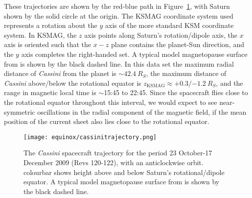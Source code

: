 These trajectories are shown by the red-blue path in Figure~\ref{equinox:fig:cassinitrajectory}, with Saturn shown by the solid circle at the origin. The KSMAG coordinate system used represents a rotation about the $y$ axis of the more standard KSM coordinate system. In KSMAG, the $z$ axis points along Saturn's rotation/dipole axis, the $x$ axis is oriented such that the $x-z$ plane contains the planet-Sun direction, and the $y$ axis completes the right-handed set. A typical model magnetopause surface from \citep{pilkington2015} is shown by the black dashed line. In this data set the maximum radial distance of \textit{Cassini} from the planet is ${\sim}\SI{42.4}{R_S}$, the maximum distance of \textit{Cassini} above/below the rotational equator is $z_\mathrm{KSMAG}\approx +0.3/\SI{-1.2}{R_S}$, and the range in magnetic local time is ${\sim}$15:45 to 22:45. Since the spacecraft flies close to the rotational equator throughout this interval, we would expect to see near-symmetric oscillations in the radial component of the magnetic field, if the mean position of the current sheet also lies close to the rotational equator.
\begin{figure}
\centering
\texttt{[image: equinox/cassinitrajectory.png]}
\caption[\textit{Cassini} spacecraft trajectory for 23 October – 17 December 2009.]{The \textit{Cassini} spacecraft trajectory for the period 23 October{\--}17 December 2009 (Revs 120{\--}122), with an anticlockwise orbit. colourbar shows height above and below Saturn's rotational/dipole equator. A typical model magnetopause surface from \citet{pilkington2015} is shown by the black dashed line.}
\label{equinox:fig:cassinitrajectory}
\end{figure}

